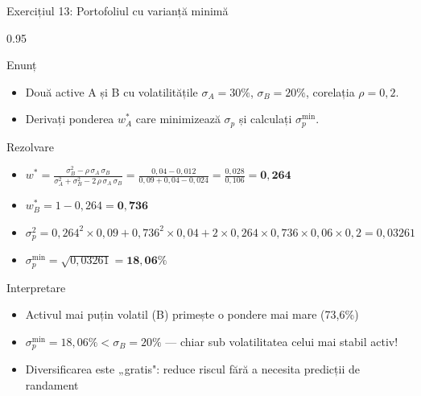 \documentclass[9pt, aspectratio=169, t]{beamer}
\begin{document}
\begin{frame}[shrink=10]{Exercițiul 13: Portofoliul cu varianță minimă}
    \begin{cminipage}{0.95\textwidth}
    \begin{block}{Enunț}
    \begin{itemize}\setlength{\itemsep}{0pt}
        \item Două active A și B cu volatilitățile $\sigma_A = 30\%$, $\sigma_B = 20\%$, corelația $\rho = 0{,}2$.
        \item Derivați ponderea $w_A^*$ care minimizează $\sigma_p$ și calculați $\sigma_p^{\min}$.
    \end{itemize}
    \end{block}
    \vspace{0.1cm}
    \begin{exampleblock}{Rezolvare}
    \begin{itemize}\setlength{\itemsep}{0pt}
        \item $w^* = \frac{\sigma_B^2 - \rho\,\sigma_A\,\sigma_B}{\sigma_A^2 + \sigma_B^2 - 2\,\rho\,\sigma_A\,\sigma_B} = \frac{0{,}04 - 0{,}012}{0{,}09 + 0{,}04 - 0{,}024} = \frac{0{,}028}{0{,}106} = \mathbf{0{,}264}$
        \item $w_B^* = 1 - 0{,}264 = \mathbf{0{,}736}$
        \item $\sigma_p^2 = 0{,}264^2 \times 0{,}09 + 0{,}736^2 \times 0{,}04 + 2 \times 0{,}264 \times 0{,}736 \times 0{,}06 \times 0{,}2 = 0{,}03261$
        \item $\sigma_p^{\min} = \sqrt{0{,}03261} = \mathbf{18{,}06\%}$
    \end{itemize}
    \end{exampleblock}
    \begin{alertblock}{Interpretare}
    \begin{itemize}\setlength{\itemsep}{0pt}
        \item Activul mai puțin volatil (B) primește o pondere mai mare (73{,}6\%)
        \item $\sigma_p^{\min} = 18{,}06\% < \sigma_B = 20\%$ --- chiar sub volatilitatea celui mai stabil activ!
        \item Diversificarea este „gratis": reduce riscul fără a necesita predicții de randament
    \end{itemize}
    \end{alertblock}
    \end{cminipage}
\end{frame}

\end{document}
